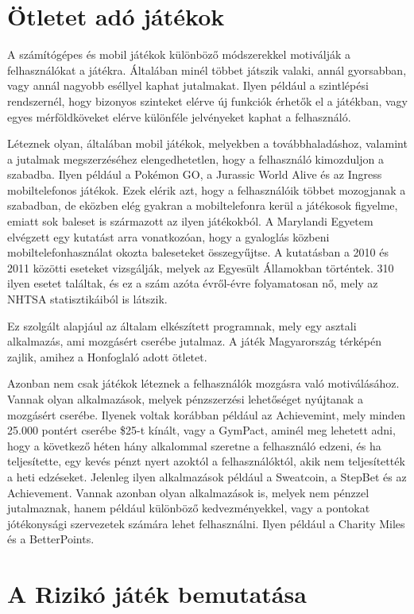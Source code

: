 \section{Ötletet adó játékok}

A számítógépes és mobil játékok különböző módszerekkel motiválják a felhasználókat a játékra.
Általában minél többet játszik valaki, annál gyorsabban, vagy annál nagyobb eséllyel kaphat jutalmakat.
Ilyen például a szintlépési rendszernél, hogy bizonyos szinteket elérve új funkciók érhetők el a játékban, vagy egyes mérföldköveket elérve különféle jelvényeket kaphat a felhasználó.

Léteznek olyan, általában mobil játékok, melyekben a továbbhaladáshoz, valamint a jutalmak megszerzéséhez elengedhetetlen, hogy a felhasználó kimozduljon a szabadba.
Ilyen például a Pokémon GO, a Jurassic World Alive és az Ingress mobiltelefonos játékok.
Ezek elérik azt, hogy a felhasználóik többet mozogjanak a szabadban, de eközben elég gyakran a mobiltelefonra kerül a játékosok figyelme, emiatt sok baleset is származott az ilyen játékokból.
A Marylandi Egyetem elvégzett egy kutatást arra vonatkozóan, hogy a gyaloglás közbeni mobiltelefonhasználat okozta baleseteket összegyűjtse.
A kutatásban a 2010 és 2011 közötti eseteket vizsgálják, melyek az Egyesült Államokban történtek.
310 ilyen esetet találtak, és ez a szám azóta évről-évre folyamatosan nő, mely az NHTSA statisztikáiból is látszik.
 
Ez szolgált alapjául az általam elkészített programnak, mely egy asztali alkalmazás, ami mozgásért cserébe jutalmaz.
A játék Magyarország térképén zajlik, amihez a Honfoglaló adott ötletet. 

Azonban nem csak játékok léteznek a felhasználók mozgásra való motiválásához.
Vannak olyan alkalmazások, melyek pénzszerzési lehetőséget nyújtanak a mozgásért cserébe.
Ilyenek voltak korábban például az Achievemint, mely minden 25.000 pontért cserébe \$25-t kínált, vagy a GymPact, aminél meg lehetett adni, hogy a következő héten hány alkalommal szeretne a felhasználó edzeni, és ha teljesítette, egy kevés pénzt nyert azoktól a felhasználóktól, akik nem teljesítették a heti edzéseket.
Jelenleg ilyen alkalmazások például a Sweatcoin, a StepBet és az Achievement.
Vannak azonban olyan alkalmazások is, melyek nem pénzzel jutalmaznak, hanem például különböző kedvezményekkel, vagy a pontokat jótékonysági szervezetek számára lehet felhasználni.
Ilyen például a Charity Miles és a BetterPoints.


\section{A Rizikó játék bemutatása}

